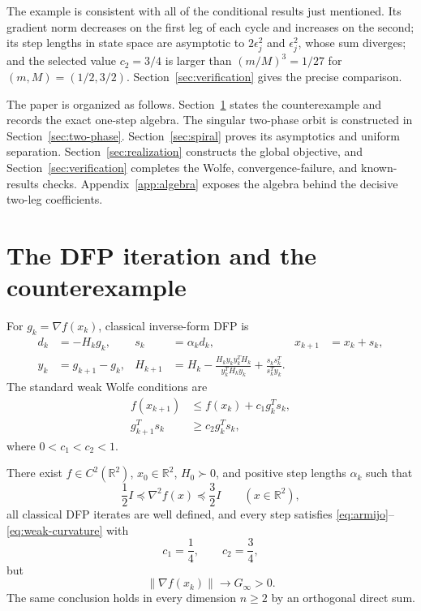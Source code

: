 \documentclass[smallextended,envcountsame]{svjour3}
\newcommand{\R}{\mathbb R}
\begin{document}
The example is consistent with all of the conditional results just
mentioned.  Its gradient norm decreases on the first leg of each cycle and
increases on the second; its step lengths in state space are asymptotic to
$2\epsilon_j^2$ and $\epsilon_j^2$, whose sum diverges; and the selected value
$c_2=3/4$ is larger than $(m/M)^3=1/27$ for
$(m,M)=(1/2,3/2)$.  Section~\ref{sec:verification} gives the precise
comparison.

The paper is organized as follows.  Section~\ref{sec:statement} states the
counterexample and records the exact one-step algebra.  The singular
two-phase orbit is constructed in Section~\ref{sec:two-phase}.
Section~\ref{sec:spiral} proves its asymptotics and uniform separation.
Section~\ref{sec:realization} constructs the global objective, and
Section~\ref{sec:verification} completes the Wolfe, convergence-failure, and
known-results checks.  Appendix~\ref{app:algebra} exposes the algebra behind
the decisive two-leg coefficients.

\section{The DFP iteration and the counterexample}
\label{sec:statement}

For $g_k=\nabla f(x_k)$, classical inverse-form DFP is
\begin{align*}
d_k&=-H_kg_k,&s_k&=\alpha_kd_k,&x_{k+1}&=x_k+s_k,\\
y_k&=g_{k+1}-g_k,&
H_{k+1}&=H_k-
\frac{H_ky_ky_k^TH_k}{y_k^TH_ky_k}
+\frac{s_ks_k^T}{s_k^Ty_k}.
\end{align*}
The standard weak Wolfe conditions are
\begin{align}
f(x_{k+1})&\le f(x_k)+c_1g_k^Ts_k,\label{eq:armijo}\\
g_{k+1}^Ts_k&\ge c_2g_k^Ts_k,
\label{eq:weak-curvature}
\end{align}
where $0<c_1<c_2<1$.

\begin{theorem}\label{thm:main}
There exist $f\in C^2(\R^2)$, $x_0\in\R^2$, $H_0\succ0$, and positive
step lengths $\alpha_k$ such that
\[
\frac12I\preceq\nabla^2f(x)\preceq\frac32I
\qquad(x\in\R^2),
\]
all classical DFP iterates are well defined, and every step satisfies
\eqref{eq:armijo}--\eqref{eq:weak-curvature} with
\[
c_1=\frac14,\qquad c_2=\frac34,
\]
but
\[
\|\nabla f(x_k)\|\longrightarrow G_\infty>0.
\]
The same conclusion holds in every dimension $n\ge2$ by an orthogonal direct
sum.
\end{theorem}
\end{document}
